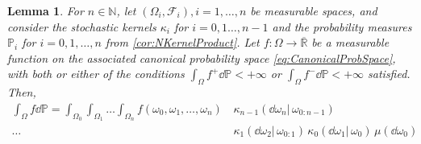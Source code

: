 \documentclass[
    a4paper,
    11pt,
    bibliography=totoc,
    listof=totoc,      
    headinclude=true,
    cleardoublepage=empty,
]{scrbook}
\theoremstyle{plain}
\newtheorem{lemma}[theorem]{Lemma}
\theoremstyle{definition}
\theoremstyle{remark}
\newcommand{\SetR}{\mathbb R}
\newcommand{\SetN}{\mathbb N}
\newcommand{\PM}{\mathbb P}
\begin{document}
\begin{lemma}
    For $n\in\SetN$, let $(\Omega_i, \mathcal{F}_i), i=1,\dots,n$ be
    measurable spaces, and consider the stochastic kernels $\kappa_i$ for 
    $i=0,1\dots,n-1$ and the probability measures $\PM_i$ for $i=0,1,\dots,n$ 
    from \cref{cor:NKernelProduct}. Let $f:\Omega\to\overline{\SetR}$ be a 
    measurable function on the associated canonical probability space 
    \eqref{eq:CanonicalProbSpace}, with both or either of the conditions $\int_\Omega f^+ \dd{\PM}<+\infty$ or $\int_\Omega f^- \dd{\PM}<+\infty$ satisfied. Then,
    \begin{equation}
    \begin{split}
        \int_\Omega f \dd{\PM} 
        = \int_{\Omega_0} \int_{\Omega_1} \dots \int_{\Omega_n}
                f(\omega_0, \omega_1, \dots, \omega_n) \,
            &\kappa_{n-1}(\dd{\omega_n} |\, \omega_{0:n-1}) \\ 
            \dots \,
            &
            \kappa_1(\dd{\omega_2} |\, \omega_{0:1}) \,
            \kappa_0(\dd{\omega_1} |\, \omega_0) \,
            \mu(\dd{\omega_0})
    \end{split}
    \end{equation}
\end{lemma}
\end{document}
